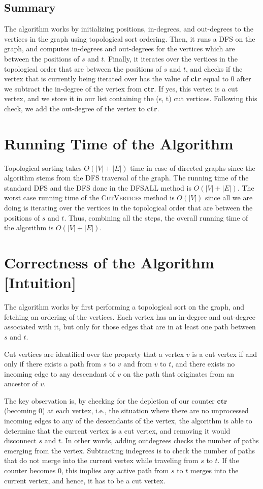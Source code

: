 \documentclass{article}
\begin{document}
\newpage


\subsection{Summary}
The algorithm works by initializing positions, in-degrees, and out-degrees to the vertices in the graph using topological sort ordering. Then, it runs a DFS on the graph, and computes in-degrees and out-degrees for the vertices which are between the positions of $s$ and $t$. Finally, it iterates over the vertices in the topological order that are between the positions of $s$ and $t$, and checks if the vertex that is currently being iterated over has the value of \textbf{ctr} equal to 0 after we subtract the in-degree of the vertex from \textbf{ctr}. If yes, this vertex is a cut vertex, and we store it in our list containing the (s, t) cut vertices. Following this check, we add the out-degree of the vertex to \textbf{ctr}.

\section{Running Time of the Algorithm}
Topological sorting takes $O(|V| + |E|)$ time in case of directed graphs since the algorithm stems from the DFS traversal of the graph. The running time of the standard DFS and the DFS done in the \textsc{DFSALL} method is $O(|V| + |E|)$. The worst case running time of the \textsc{CutVertices} method is $O(|V|)$ since all we are doing is iterating over the vertices in the topological order that are between the positions of $s$ and $t$. Thus, combining all the steps, the overall running time of the algorithm is $O(|V| + |E|)$.


\section{Correctness of the Algorithm [Intuition]}
The algorithm works by first performing a topological sort on the graph, and fetching an ordering of the vertices. Each vertex has an in-degree and out-degree associated with it, but only for those edges that are in at least one path between $s$ and $t$. 

Cut vertices are identified over the property that a vertex $v$ is a cut vertex if and only if there exists a path from $s$ to $v$ and from $v$ to $t$, and there exists no incoming edge to any descendant of $v$ on the path that originates from an ancestor of $v$.

The key observation is, by checking for the depletion of our counter $\textbf{ctr}$ (becoming $0$) at each vertex, i.e., the situation where there are no unprocessed incoming edges to any of the descendants of the vertex, the algorithm is able to determine that the current vertex is a cut vertex, and removing it would disconnect $s$ and $t$. In other words, adding outdegrees checks the number of paths emerging from the vertex. Subtracting indegrees is to check the number of paths that do not merge into the current vertex while traveling from $s$ to $t$. If the counter becomes $0$, this implies any active path from $s$ to $t$ merges into the current vertex, and hence, it has to be a cut vertex.
\end{document}
